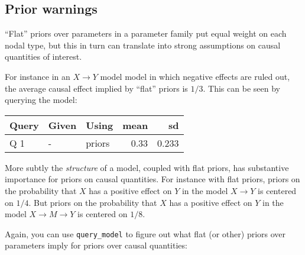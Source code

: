 \documentclass[
  12pt,
]{book}
\newenvironment{Shaded}{\begin{snugshade}}{\end{snugshade}}
\newcommand{\DataTypeTok}[1]{\textcolor[rgb]{0.13,0.29,0.53}{#1}}
\newcommand{\DecValTok}[1]{\textcolor[rgb]{0.00,0.00,0.81}{#1}}
\newcommand{\KeywordTok}[1]{\textcolor[rgb]{0.13,0.29,0.53}{\textbf{#1}}}
\newcommand{\NormalTok}[1]{#1}
\newcommand{\OperatorTok}[1]{\textcolor[rgb]{0.81,0.36,0.00}{\textbf{#1}}}
\newcommand{\StringTok}[1]{\textcolor[rgb]{0.31,0.60,0.02}{#1}}
\begin{document}
\hypertarget{prior-warnings}{%
\subsection{Prior warnings}\label{prior-warnings}}

``Flat'' priors over parameters in a parameter family put equal weight on each nodal type, but this in turn can translate into strong assumptions on causal quantities of interest.

For instance in an \(X \rightarrow Y\) model model in which negative effects are ruled out, the average causal effect implied by ``flat'' priors is \(1/3\). This can be seen by querying the model:

\begin{Shaded}
\end{Shaded}

\begin{tabular}{l|l|l|r|r}
\hline
Query & Given & Using & mean & sd\\
\hline
Q 1 & - & priors & 0.33 & 0.233\\
\hline
\end{tabular}

More subtly the \emph{structure} of a model, coupled with flat priors, has substantive importance for priors on causal quantities. For instance with flat priors, priors on the probability that \(X\) has a positive effect on \(Y\) in the model \(X \rightarrow Y\) is centered on \(1/4\). But priors on the probability that \(X\) has a positive effect on \(Y\) in the model \(X \rightarrow M \rightarrow Y\) is centered on \(1/8\).

Again, you can use \texttt{query\_model} to figure out what flat (or other) priors over parameters imply for priors over causal quantities:

\begin{Shaded}
\end{Shaded}
\end{document}
